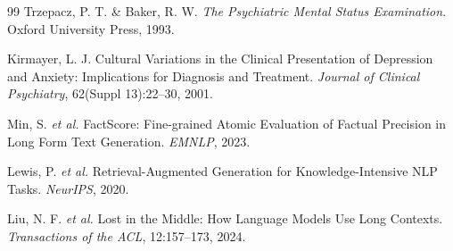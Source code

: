 \documentclass[12pt,a4paper]{article}
\begin{document}
\begin{thebibliography}{99}
Trzepacz, P. T. \& Baker, R. W. \textit{The Psychiatric Mental Status Examination}. Oxford University Press, 1993.

Kirmayer, L. J. Cultural Variations in the Clinical Presentation of Depression and Anxiety: Implications for Diagnosis and Treatment. \textit{Journal of Clinical Psychiatry}, 62(Suppl 13):22--30, 2001.

Min, S. \textit{et al.} FactScore: Fine-grained Atomic Evaluation of Factual Precision in Long Form Text Generation. \textit{EMNLP}, 2023.

Lewis, P. \textit{et al.} Retrieval-Augmented Generation for Knowledge-Intensive NLP Tasks. \textit{NeurIPS}, 2020.

Liu, N. F. \textit{et al.} Lost in the Middle: How Language Models Use Long Contexts. \textit{Transactions of the ACL}, 12:157--173, 2024.

\end{thebibliography}
\end{document}
